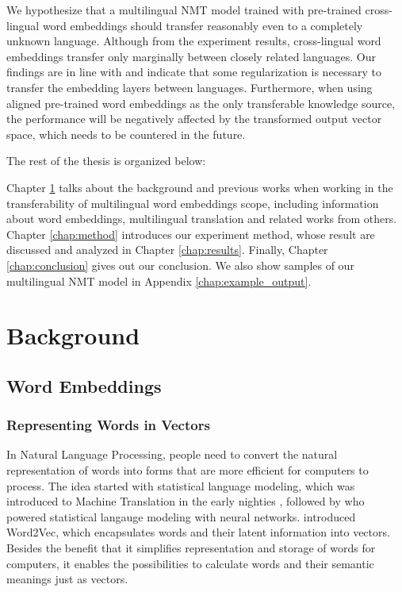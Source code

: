 \documentclass[thesis,fonts=libertine]{cluu}
\begin{document}
We hypothesize that a multilingual NMT model trained with pre-trained cross-lingual word embeddings should transfer reasonably even to a completely unknown language. Although from the experiment results, cross-lingual word embeddings transfer only marginally between closely related languages. Our findings are in line with \textcite{aji-etal-2020-neural} and indicate that some regularization is necessary to transfer the embedding layers between languages. Furthermore, when using aligned pre-trained word embeddings as the only transferable knowledge source, the performance will be negatively affected by the transformed output vector space, which needs to be countered in the future.

The rest of the thesis is organized below:

Chapter \ref{chap:background} talks about the background and previous works when working in the transferability of multilingual word embeddings scope, including information about word embeddings, multilingual translation and related works from others. Chapter \ref{chap:method} introduces our experiment method, whose result are discussed and analyzed in Chapter \ref{chap:results}. Finally, Chapter \ref{chap:conclusion} gives out our conclusion. We also show samples of our multilingual NMT model in Appendix \ref{chap:example_output}.

\chapter{Background}
\label{chap:background}

\section{Word Embeddings}
\subsection{Representing Words in Vectors}

In Natural Language Processing, people need to convert the natural representation of words into forms that are more efficient for computers to process. The idea started with statistical language modeling, which was introduced to Machine Translation in the early nighties \parencite{brown-etal-1990-statistical}, followed by \textcite{bengio2003neural} who powered statistical langauge modeling with neural networks. \textcite{Mikolov:2013aa} introduced Word2Vec, which encapsulates words and their latent information into vectors. Besides the benefit that it simplifies representation and storage of words for computers, it enables the possibilities to calculate words and their semantic meanings just as vectors.
\end{document}

